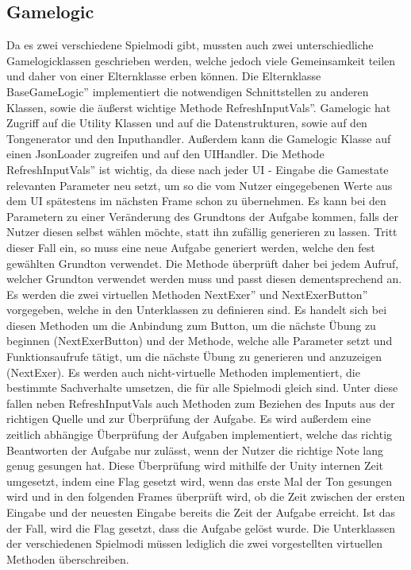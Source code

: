 \subsection*{Gamelogic}
Da es zwei verschiedene Spielmodi gibt, mussten auch zwei unterschiedliche Gamelogicklassen geschrieben werden, welche jedoch viele Gemeinsamkeit teilen und daher von einer Elternklasse erben können. Die Elternklasse \glqq BaseGameLogic'' implementiert die notwendigen Schnittstellen zu anderen Klassen, sowie die äußerst wichtige Methode \glqq RefreshInputVals''. Gamelogic hat Zugriff auf die Utility Klassen und auf die Datenstrukturen, sowie auf den Tongenerator und den Inputhandler. Außerdem kann die Gamelogic Klasse auf einen JsonLoader zugreifen und auf den UIHandler. Die Methode \glqq RefreshInputVals'' ist wichtig, da diese nach jeder UI - Eingabe die Gamestate relevanten Parameter neu setzt, um so die vom Nutzer eingegebenen Werte aus dem UI spätestens im nächsten Frame schon zu übernehmen. Es kann bei den Parametern zu einer Veränderung des Grundtons der Aufgabe kommen, falls der Nutzer diesen selbst wählen möchte, statt ihn zufällig generieren zu lassen. Tritt dieser Fall ein, so muss eine neue Aufgabe generiert werden, welche den fest gewählten Grundton verwendet. Die Methode überprüft daher bei jedem Aufruf, welcher Grundton verwendet werden muss und passt diesen dementsprechend an. Es werden die zwei virtuellen Methoden \glqq NextExer'' und \glqq NextExerButton'' vorgegeben, welche in den Unterklassen zu definieren sind. Es handelt sich bei diesen Methoden um die Anbindung zum Button, um die nächste Übung zu beginnen (NextExerButton) und der Methode, welche alle Parameter setzt und Funktionsaufrufe tätigt, um die nächste Übung zu generieren und anzuzeigen (NextExer). Es werden auch nicht-virtuelle Methoden implementiert, die bestimmte Sachverhalte umsetzen, die für alle Spielmodi gleich sind. Unter diese fallen neben RefreshInputVals auch Methoden zum Beziehen des Inputs aus der richtigen Quelle und zur Überprüfung der Aufgabe. Es wird außerdem eine zeitlich abhängige Überprüfung der Aufgaben implementiert, welche das richtig Beantworten der Aufgabe nur zulässt, wenn der Nutzer die richtige Note lang genug gesungen hat. Diese Überprüfung wird mithilfe der Unity internen Zeit umgesetzt, indem eine Flag gesetzt wird, wenn das erste Mal der Ton gesungen wird und in den folgenden Frames überprüft wird, ob die Zeit zwischen der ersten Eingabe und der neuesten Eingabe bereits die Zeit der Aufgabe erreicht. Ist das der Fall, wird die Flag gesetzt, dass die Aufgabe gelöst wurde. Die Unterklassen der verschiedenen Spielmodi müssen lediglich die zwei vorgestellten virtuellen Methoden überschreiben.\\
